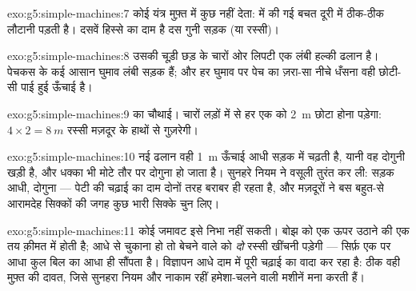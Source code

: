 \begin{solution}{exo:g5:simple-machines:7}
कोई यंत्र मुफ़्त में कुछ नहीं देता:  में की गई बचत दूरी में
ठीक-ठीक लौटानी पड़ती है। दसवें हिस्से  का दाम है दस गुनी सड़क (या
रस्सी)।
\end{solution}

\begin{solution}{exo:g5:simple-machines:8}
उसकी चूड़ी छड़ के चारों ओर लिपटी एक लंबी हल्की ढलान है। पेचकस के कई
आसान घुमाव लंबी सड़क हैं; और हर घुमाव पर पेच का ज़रा-सा नीचे धँसना
वही छोटी-सी पाई हुई ऊँचाई है।
\end{solution}

\begin{solution}{exo:g5:simple-machines:9}
 का चौथाई। चारों लड़ों में से हर एक को \qty{2}{m} छोटा होना पड़ेगा:
$4 \times 2 = \qty{8}{m}$ रस्सी मज़दूर के हाथों से गुज़रेगी।
\end{solution}

\begin{solution}{exo:g5:simple-machines:10}
नई ढलान वही \qty{1}{m} ऊँचाई आधी सड़क में चढ़ती है, यानी वह दोगुनी
खड़ी है, और धक्का भी मोटे तौर पर दोगुना हो जाता है। सुनहरे नियम ने
वसूली तुरंत कर ली: सड़क आधी,  दोगुना --- पेटी की चढ़ाई का दाम
दोनों तरह बराबर ही रहता है, और मज़दूरों ने बस बहुत-से आरामदेह सिक्कों
की जगह कुछ भारी सिक्के चुन लिए।
\end{solution}

\begin{solution}{exo:g5:simple-machines:11}
कोई जमावट इसे निभा नहीं सकती। बोझ को एक  ऊपर उठाने की एक तय
क़ीमत  में होती है; आधे  से चुकाना हो तो बेचने वाले को
\emph{दो}  रस्सी खींचनी पड़ेगी --- सिर्फ़ एक  पर आधा  कुल
बिल का आधा ही सौंपता है। विज्ञापन आधे दाम में पूरी चढ़ाई का वादा कर
रहा है: ठीक वही मुफ़्त की दावत, जिसे सुनहरा नियम और नाकाम रहीं
हमेशा-चलने वाली मशीनें मना करती हैं।
\end{solution}
